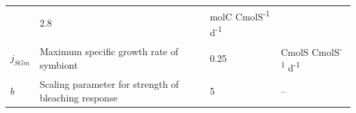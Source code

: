 \documentclass[]{elsarticle} %
\begin{document}
\begin{longtable}[c]{@{}llll@{}}
\begin{minipage}[t]{0.48\columnwidth}
\strut\end{minipage} &
\begin{minipage}[t]{0.09\columnwidth}\raggedright\strut
2.8
\strut\end{minipage} &
\begin{minipage}[t]{0.23\columnwidth}\raggedright\strut
molC CmolS\textsuperscript{-1} d\textsuperscript{-1}
\strut\end{minipage}\tabularnewline
\begin{minipage}[t]{0.10\columnwidth}\raggedright\strut
\(j_{SGm}\)
\strut\end{minipage} &
\begin{minipage}[t]{0.48\columnwidth}\raggedright\strut
Maximum specific growth rate of symbiont
\strut\end{minipage} &
\begin{minipage}[t]{0.09\columnwidth}\raggedright\strut
0.25
\strut\end{minipage} &
\begin{minipage}[t]{0.23\columnwidth}\raggedright\strut
CmolS CmolS\textsuperscript{-1} d\textsuperscript{-1}
\strut\end{minipage}\tabularnewline
\begin{minipage}[t]{0.10\columnwidth}\raggedright\strut
\(b\)
\strut\end{minipage} &
\begin{minipage}[t]{0.48\columnwidth}\raggedright\strut
Scaling parameter for strength of bleaching response
\strut\end{minipage} &
\begin{minipage}[t]{0.09\columnwidth}\raggedright\strut
5
\strut\end{minipage} &
\begin{minipage}[t]{0.23\columnwidth}\raggedright\strut
--
\strut\end{minipage}\tabularnewline
\bottomrule
\end{longtable}
\end{document}
